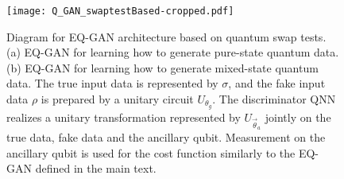 \documentclass[prl,superscriptaddress,twocolumn]{revtex4}
\theoremstyle{plain}
\theoremstyle{definition}
\begin{document}
\begin{figure}[h!]
\begin{center}
\texttt{[image: Q\_GAN\_swaptestBased-cropped.pdf]}
\caption{Diagram for EQ-GAN architecture based on quantum swap tests. (a) EQ-GAN for learning how to generate pure-state quantum data. (b) EQ-GAN for learning how to generate mixed-state quantum data. The true input data is represented by $\sigma$, and the fake input data $\rho$ is prepared by a unitary circuit $U_{\theta_g}$. The discriminator QNN realizes a unitary transformation represented by $U_{\vec{\theta}_a}$ jointly on the true data, fake data and the ancillary qubit. Measurement on the ancillary qubit is used for the cost function similarly to the EQ-GAN defined in the main text.
\label{QGANsfig}}
\end{center}
\end{figure} 
\end{document}

